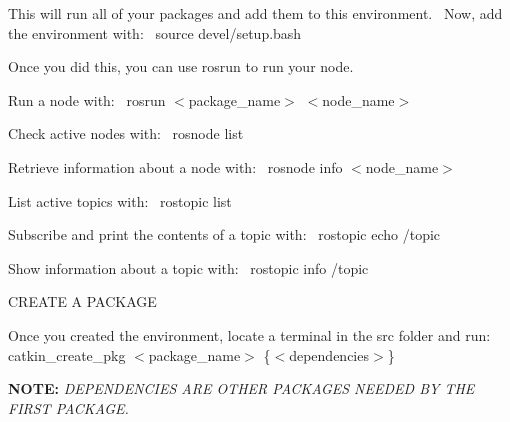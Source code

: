 This will run all of your packages and add them to this environment.~\newline
Now, add the environment with\+:~\newline
{\ttfamily source devel/setup.\+bash}

Once you did this, you can use rosrun to run your node.

Run a node with\+:~\newline
{\ttfamily rosrun $<$package\+\_\+name$>$ $<$node\+\_\+name$>$}

Check active nodes with\+:~\newline
{\ttfamily rosnode list}

Retrieve information about a node with\+:~\newline
{\ttfamily rosnode info $<$node\+\_\+name$>$}

List active topics with\+:~\newline
{\ttfamily rostopic list}

Subscribe and print the contents of a topic with\+:~\newline
{\ttfamily rostopic echo /topic}

Show information about a topic with\+:~\newline
{\ttfamily rostopic info /topic} \begin{DoxyVerb}                           CREATE A PACKAGE
\end{DoxyVerb}


Once you created the environment, locate a terminal in the src folder and run\+:~\newline
{\ttfamily catkin\+\_\+create\+\_\+pkg $<$package\+\_\+name$>$ \{$<$dependencies$>$\}}

{\bfseries N\+O\+TE\+:} {\itshape D\+E\+P\+E\+N\+D\+E\+N\+C\+I\+ES A\+RE O\+T\+H\+ER P\+A\+C\+K\+A\+G\+ES N\+E\+E\+D\+ED BY T\+HE F\+I\+R\+ST P\+A\+C\+K\+A\+GE.}


